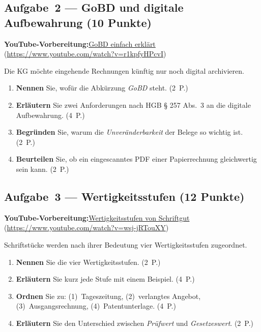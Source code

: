 \documentclass[11pt, a4paper]{article}
\begin{document}
\subsection*{Aufgabe~2 --- GoBD und digitale Aufbewahrung (10 Punkte)}

\noindent\textbf{\color{bfwAccent}YouTube-Vorbereitung:}\enspace \href{https://www.youtube.com/watch?v=r1kpfyHPcvI}{GoBD einfach erklärt} (\url{https://www.youtube.com/watch?v=r1kpfyHPcvI})

\medskip
Die KG möchte eingehende Rechnungen künftig nur noch digital archivieren.

\begin{enumerate}[label=(\alph*)]
  \item \textbf{Nennen} Sie, wofür die Abkürzung \emph{GoBD} steht. \hfill (2~P.)
  \item \textbf{Erläutern} Sie zwei Anforderungen nach HGB § 257 Abs.~3 an die digitale Aufbewahrung. \hfill (4~P.)
  \item \textbf{Begründen} Sie, warum die \emph{Unveränderbarkeit} der Belege so wichtig ist. \hfill (2~P.)
  \item \textbf{Beurteilen} Sie, ob ein eingescanntes PDF einer Papierrechnung gleichwertig sein kann. \hfill (2~P.)
\end{enumerate}

\subsection*{Aufgabe~3 --- Wertigkeitsstufen (12 Punkte)}

\noindent\textbf{\color{bfwAccent}YouTube-Vorbereitung:}\enspace \href{https://www.youtube.com/watch?v=wsj-jRTouXY}{Wertigkeitsstufen von Schriftgut} (\url{https://www.youtube.com/watch?v=wsj-jRTouXY})

\medskip
Schriftstücke werden nach ihrer Bedeutung vier Wertigkeitsstufen zugeordnet.

\begin{enumerate}[label=(\alph*)]
  \item \textbf{Nennen} Sie die vier Wertigkeitsstufen. \hfill (2~P.)
  \item \textbf{Erläutern} Sie kurz jede Stufe mit einem Beispiel. \hfill (4~P.)
  \item \textbf{Ordnen} Sie zu: (1)~Tageszeitung, (2)~verlangtes Angebot, (3)~Ausgangsrechnung, (4)~Patentunterlage. \hfill (4~P.)
  \item \textbf{Erläutern} Sie den Unterschied zwischen \emph{Prüfwert} und \emph{Gesetzeswert}. \hfill (2~P.)
\end{enumerate}
\end{document}
